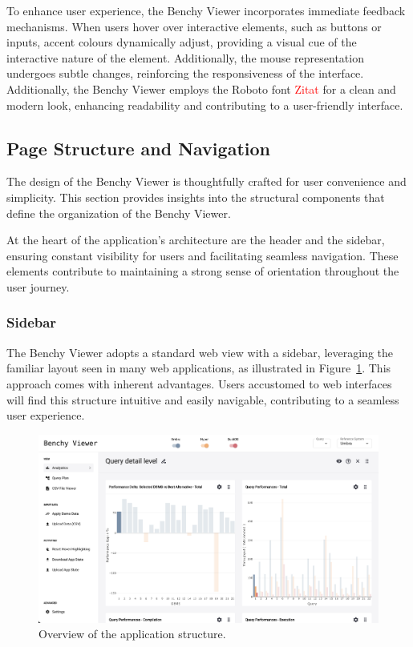 To enhance user experience, the Benchy Viewer incorporates immediate feedback mechanisms. When users hover over interactive elements, such as buttons or inputs, accent colours dynamically adjust, providing a visual cue of the interactive nature of the element. Additionally, the mouse representation undergoes subtle changes, reinforcing the responsiveness of the interface.\\
Additionally, the Benchy Viewer employs the Roboto font \textcolor{red}{Zitat} for a clean and modern look, enhancing readability and contributing to a user-friendly interface.


\subsection{Page Structure and Navigation}\label{sec:page-structure}

The design of the Benchy Viewer is thoughtfully crafted for user convenience and simplicity. This section provides insights into the structural components that define the organization of the Benchy Viewer.

At the heart of the application's architecture are the header and the sidebar, ensuring constant visibility for users and facilitating seamless navigation. These elements contribute to maintaining a strong sense of orientation throughout the user journey.


\subsubsection{Sidebar}

The Benchy Viewer adopts a standard web view with a sidebar, leveraging the familiar layout seen in many web applications, as illustrated in Figure~\ref{fig:app}. This approach comes with inherent advantages. Users accustomed to web interfaces will find this structure intuitive and easily navigable, contributing to a seamless user experience.

\begin{figure}[h]
  \centering
  \includegraphics[width=1\linewidth]{figures/app.png}
  \caption{Overview of the application structure.}
  \label{fig:app}
\end{figure}


